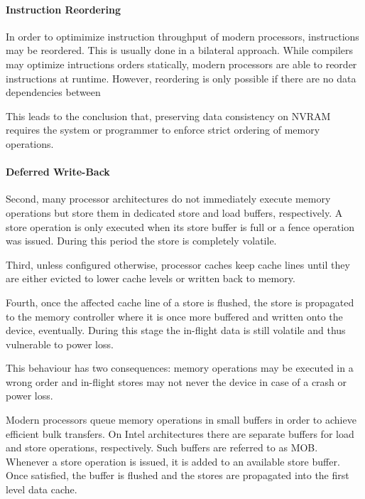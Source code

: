 \paragraph{Instruction Reordering}


In order to optimimize instruction throughput of modern processors, instructions may be reordered. This is usually done in a bilateral approach. While compilers may optimize intructions orders statically, modern processors are able to reorder instructions at runtime. However, reordering is only possible if there are no data dependencies between


This leads to the conclusion that, preserving data consistency on NVRAM requires the system or programmer to enforce strict ordering of memory operations.

\paragraph{Deferred Write-Back}


Second, many processor architectures do not immediately execute memory
operations but store them in dedicated store and load buffers, respectively. A
store operation is only executed when its store buffer is full or a fence
operation was issued. During this period the store is completely volatile.

Third, unless configured otherwise, processor caches keep cache lines until they
are either evicted to lower cache levels or written back to memory.

Fourth, once the affected cache line of a store is flushed, the store is
propagated to the memory controller where it is once more buffered and written
onto the device, eventually. During this stage the in-flight data is still
volatile and thus vulnerable to power loss.

This behaviour has two consequences: memory operations may be executed in a
wrong order and in-flight stores may not never the device in case of a crash
or power loss.

Modern processors queue memory operations in small buffers in order to achieve
efficient bulk transfers. On Intel  architectures there are separate
buffers for load and store operations, respectively. Such buffers are referred
to as MOB. Whenever a store operation is issued, it is added to an
available store buffer. Once satisfied, the buffer is flushed and the stores are
propagated into the first level data cache.

